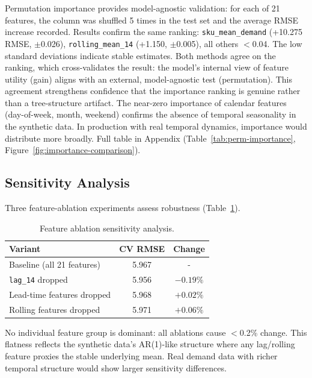 \documentclass[11pt,letterpaper]{article}
\begin{document}
Permutation importance provides model-agnostic validation: for each of 21 features, the column was shuffled 5 times in the test set and the average RMSE increase recorded. Results confirm the same ranking: \texttt{sku\_mean\_demand} (+10.275 RMSE, $\pm$0.026), \texttt{rolling\_mean\_14} (+1.150, $\pm$0.005), all others $<$0.04. The low standard deviations indicate stable estimates. Both methods agree on the ranking, which cross-validates the result: the model's internal view of feature utility (gain) aligns with an external, model-agnostic test (permutation). This agreement strengthens confidence that the importance ranking is genuine rather than a tree-structure artifact. The near-zero importance of calendar features (day-of-week, month, weekend) confirms the absence of temporal seasonality in the synthetic data. In production with real temporal dynamics, importance would distribute more broadly. Full table in Appendix (Table~\ref{tab:perm-importance}, Figure~\ref{fig:importance-comparison}).

\subsection{Sensitivity Analysis}

Three feature-ablation experiments assess robustness (Table~\ref{tab:sensitivity}).

\begin{table}[H]
\centering
\caption{Feature ablation sensitivity analysis.}
\label{tab:sensitivity}
\small
\begin{tabular}{@{}lcc@{}}
\toprule
\textbf{Variant} & \textbf{CV RMSE} & \textbf{Change} \\
\midrule
Baseline (all 21 features) & 5.967 & - \\
\texttt{lag\_14} dropped & 5.956 & $-0.19\%$ \\
Lead-time features dropped & 5.968 & $+0.02\%$ \\
Rolling features dropped & 5.971 & $+0.06\%$ \\
\bottomrule
\end{tabular}
\end{table}

No individual feature group is dominant: all ablations cause $<$0.2\% change. This flatness reflects the synthetic data's AR(1)-like structure where any lag/rolling feature proxies the stable underlying mean. Real demand data with richer temporal structure would show larger sensitivity differences.


\end{document}
